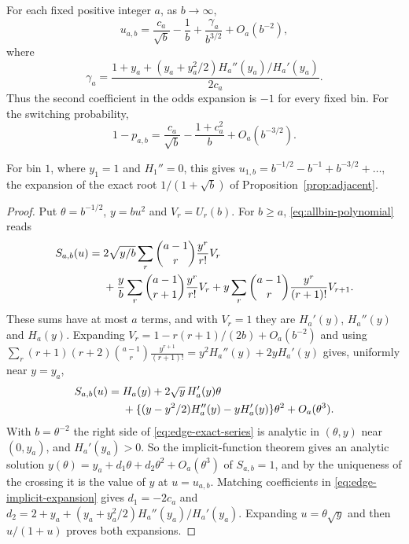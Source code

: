 \begin{theorem}\label{thm:edge-laguerre}
For each fixed positive integer $a$, as $b\to\infty$,
\begin{equation}\label{eq:edge-crossing-expansion}
 u_{a,b}=\frac{c_a}{\sqrt b}-\frac1b
 +\frac{\gamma_a}{b^{3/2}}+O_a(b^{-2}),
\end{equation}
where
\[
 \gamma_a=
 \frac{1+y_a+(y_a+y_a^2/2)H_a''(y_a)/H_a'(y_a)}{2c_a}.
\]
Thus the second coefficient in the odds expansion is $-1$ for every fixed
bin. For the switching probability,
\begin{equation}\label{eq:edge-q-expansion}
 1-p_{a,b}=\frac{c_a}{\sqrt b}-\frac{1+c_a^2}{b}+O_a(b^{-3/2}).
\end{equation}
\end{theorem}

For bin $1$, where $y_1=1$ and $H_1''=0$, this gives
$u_{1,b}=b^{-1/2}-b^{-1}+b^{-3/2}+\dots$, the expansion of the exact root
$1/(1+\sqrt b)$ of Proposition~\ref{prop:adjacent}.

\begin{proof}
Put $\theta=b^{-1/2}$, $y=bu^2$ and $V_r=U_r(b)$. For $b\ge a$,
\eqref{eq:allbin-polynomial} reads
\begin{align}
 S_{a,b}(u)={}&2\sqrt{y/b}\sum_r\binom{a-1}{r}\frac{y^r}{r!}V_r\notag\\
 &+\frac yb\sum_r\binom{a-1}{r+1}\frac{y^r}{r!}V_r
 +y\sum_r\binom{a-1}{r}\frac{y^r}{(r+1)!}V_{r+1}.
 \label{eq:edge-exact-series}
\end{align}
These sums have at most $a$ terms, and with $V_r=1$ they are $H_a'(y)$,
$H_a''(y)$ and $H_a(y)$. Expanding $V_r=1-r(r+1)/(2b)+O_a(b^{-2})$ and using
$\sum_r(r+1)(r+2)\binom{a-1}{r}\frac{y^{r+1}}{(r+1)!}=y^2H_a''(y)+2yH_a'(y)$
gives, uniformly near $y=y_a$,
\begin{align}
 S_{a,b}(u)={}&H_a(y)+2\sqrt y\,H_a'(y)\theta\notag\\
 &+\{(y-y^2/2)H_a''(y)-yH_a'(y)\}\theta^2+O_a(\theta^3).
 \label{eq:edge-implicit-expansion}
\end{align}
With $b=\theta^{-2}$ the right side of \eqref{eq:edge-exact-series} is
analytic in $(\theta,y)$ near $(0,y_a)$, and $H_a'(y_a)>0$. So the
implicit-function theorem gives an analytic solution
$y(\theta)=y_a+d_1\theta+d_2\theta^2+O_a(\theta^3)$ of $S_{a,b}=1$,
and by the uniqueness of the crossing it is the value of $y$ at $u=u_{a,b}$.
Matching coefficients in \eqref{eq:edge-implicit-expansion} gives $d_1=-2c_a$
and $d_2=2+y_a+(y_a+y_a^2/2)H_a''(y_a)/H_a'(y_a)$. Expanding $u=\theta\sqrt y$
and then $u/(1+u)$ proves both expansions.
\end{proof}

